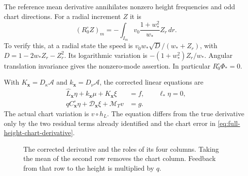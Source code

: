 The reference mean derivative annihilates nonzero height frequencies
and odd chart directions. For a radial increment $Z$ it is
\begin{equation}\label{eq:rewrite-reference-circle-row}
 (R_0^\circ Z)_m
 =-\int_{I_m}v_0\frac{1+w_*^2}{w_*}Z_r\,dr.
\end{equation}
To verify this, at a radial state the speed is
$v_0w_*\sqrt D/(w_*+Z_r)$, with
$D=1-2w_*Z_r-Z_r^2$. Its logarithmic variation is
$-(1+w_*^2)Z_r/w_*$. Angular translation invariance gives the
nonzero-mode assertion. In particular $R_0^\circ\Phi_*=0$.

With $K_{\mathbf x}=D_\kappa\mathcal A$ and
$k_{\mathbf x}=D_\nu\mathcal A$, the corrected linear equations are
\begin{equation}\label{eq:corrected-coupled-linear-system}
 \begin{split}
 \widehat L_{\mathbf x}\eta+k_{\mathbf x}\mu+K_{\mathbf x}\xi&=f,
                    \qquad \ell_*\eta=0,\\
 qC_{\mathbf x}^{\circ}\eta+\mathcal D_{\mathbf x}\xi
                            +\mathcal M_Tv&=g.
 \end{split}
\end{equation}
The actual chart variation is $v\circ h_L$. The equation differs
from the true derivative only by the two residual terms already
identified and the chart error in
\eqref{eq:full-height-chart-derivative}.

\begin{figure}[htbp]
\centering
{}
\caption{The corrected derivative and the roles of its four columns.
Taking the mean of the second row removes the chart column. Feedback
from that row to the height is multiplied by $q$.}
\label{fig:coupled-columns}
\end{figure}

